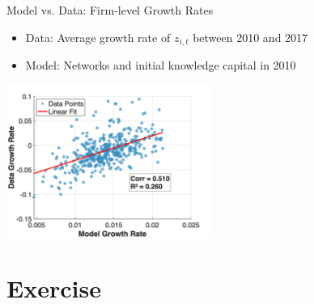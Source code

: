 \documentclass[
  10pt,
  aspectratio=169,   %
]{beamer}
\theoremstyle{plain}
\begin{document}
\begin{frame}{Model vs. Data: Firm-level Growth Rates}
  \begin{itemize}
    \item Data: Average growth rate of $z_{i,t}$ between 2010 and 2017
    \medskip{}
    \item Model: Networks and initial knowledge capital in 2010
  \end{itemize}
  \medskip{}
  \begin{center}
    \includegraphics[width=0.5\textwidth]{figures/NO_growth_rate_comparison.png}
  \end{center}
\end{frame}

\section{Exercise}
\end{document}

